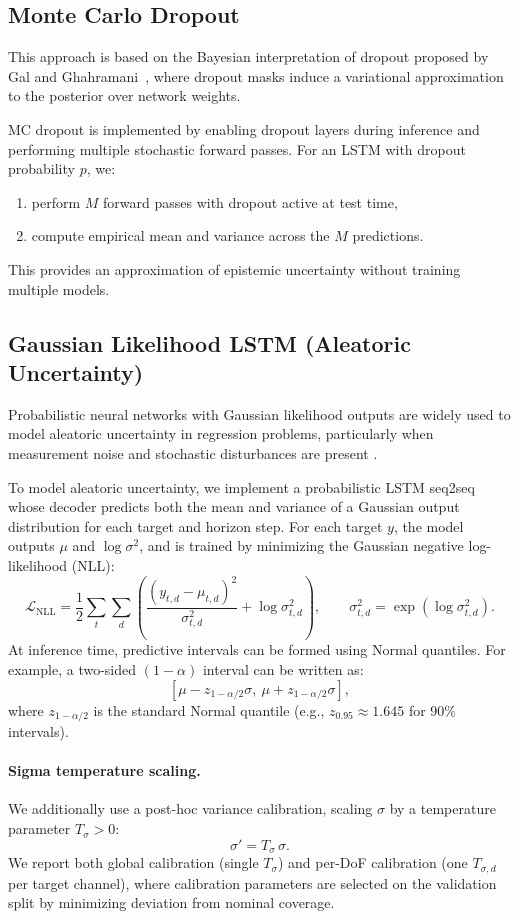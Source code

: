 \documentclass[a4paper,fleqn]{cas-sc}
\begin{document}
\subsection{Monte Carlo Dropout}

This approach is based on the Bayesian interpretation of dropout proposed by Gal and Ghahramani~\cite{gal2016dropout}, where dropout masks induce a variational approximation to the posterior over network weights.


MC dropout is implemented by enabling dropout layers during inference and performing multiple stochastic forward passes. For an LSTM with dropout probability \(p\), we:
\begin{enumerate}
    \item perform \(M\) forward passes with dropout active at test time,
    \item compute empirical mean and variance across the \(M\) predictions.
\end{enumerate}
This provides an approximation of epistemic uncertainty without training multiple models.


\subsection{Gaussian Likelihood LSTM (Aleatoric Uncertainty)}
\label{sec:gaussian-method}

Probabilistic neural networks with Gaussian likelihood outputs are widely used to model aleatoric uncertainty in regression problems, particularly when measurement noise and stochastic disturbances are present \cite{ovadia2019can}.


To model aleatoric uncertainty, we implement a probabilistic LSTM seq2seq whose decoder predicts both the mean and variance of a Gaussian output distribution for each target and horizon step. For each target \(y\), the model outputs \(\mu\) and \(\log \sigma^2\), and is trained by minimizing the Gaussian negative log-likelihood (NLL):
\[
\mathcal{L}_{\mathrm{NLL}} =
\frac{1}{2}\sum_{t}\sum_{d}
\left(
\frac{(y_{t,d}-\mu_{t,d})^2}{\sigma_{t,d}^2} + \log \sigma_{t,d}^2
\right),
\qquad \sigma_{t,d}^2 = \exp(\log \sigma_{t,d}^2).
\]
At inference time, predictive intervals can be formed using Normal quantiles. For example, a two-sided \((1-\alpha)\) interval can be written as:
\[
[\mu - z_{1-\alpha/2}\sigma,\ \mu + z_{1-\alpha/2}\sigma],
\]
where \(z_{1-\alpha/2}\) is the standard Normal quantile (e.g., \(z_{0.95}\approx 1.645\) for 90\% intervals).

\paragraph{Sigma temperature scaling.}
We additionally use a post-hoc variance calibration, scaling \(\sigma\) by a temperature parameter \(T_{\sigma}>0\):
\[
\sigma' = T_{\sigma}\,\sigma.
\]
We report both global calibration (single \(T_{\sigma}\)) and per-DoF calibration (one \(T_{\sigma,d}\) per target channel), where calibration parameters are selected on the validation split by minimizing deviation from nominal coverage.
\end{document}

